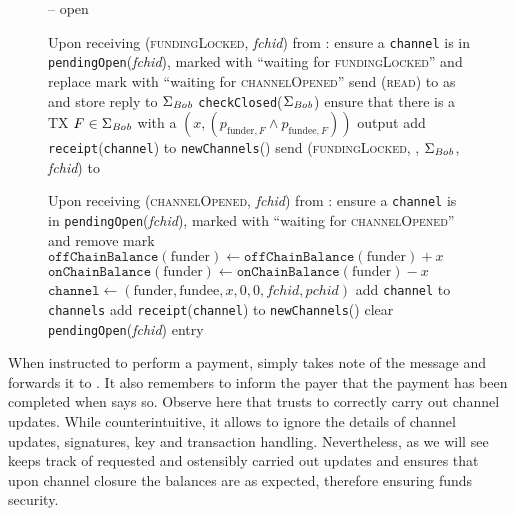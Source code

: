 \begin{figure}[H]
\begin{systembox}{\fpaynet{} -- open}
\begin{algorithmic}[1]
        \State Upon receiving (\textsc{fundingLocked}, \textit{fchid}) from
        \simulator:
        \Indent
          \State ensure a \texttt{channel} is in
          \texttt{pendingOpen}(\textit{fchid}), marked with ``waiting for
          \textsc{fundingLocked}'' and replace mark with ``waiting for
          \textsc{channelOpened}''
          \State send (\textsc{read}) to \ledger{} as \bob{} and store reply
          to $\Sigma_{\mathit{Bob}}$
          \State \texttt{checkClosed}($\Sigma_{\mathit{Bob}}$)
          \label{alg:fpaynet:checkForNew:read:bob}
          \State ensure that there is a TX $F \in \Sigma_{\mathit{Bob}}$ with a
          $\left(x, \left(p_{\mathrm{funder}, F} \wedge p_{\mathrm{fundee},
          F}\right)\right)$ output
          \State add \texttt{receipt}(\texttt{channel}) to
          \texttt{newChannels}(\bob)
          \label{alg:fpaynet:fundingLocked:report}
          \State send (\textsc{fundingLocked}, \bob, $\Sigma_{\mathit{Bob}}$,
          \textit{fchid}) to \simulator
          \label{alg:fpaynet:fundingLocked:sim}
        \EndIndent
        \Statex

        \State Upon receiving (\textsc{channelOpened}, \textit{fchid}) from
        \simulator:
        \Indent
          \State ensure a \texttt{channel} is in
          \texttt{pendingOpen}(\textit{fchid}), marked with ``waiting for
          \textsc{channelOpened}'' and remove mark
          \State $\mathtt{offChainBalance}\left(\mathrm{funder}\right) \gets
          \mathtt{offChainBalance}\left(\mathrm{funder}\right) + x$
          \label{alg:fpaynet:channelOpened:offchain}
          \State $\mathtt{onChainBalance}\left(\mathrm{funder}\right) \gets
          \mathtt{onChainBalance}\left(\mathrm{funder}\right) - x$
          \label{alg:fpaynet:channelOpened:onchain}
          \State $\mathtt{channel} \gets \left(\mathrm{funder}, \mathrm{fundee},
          x, 0, 0, \mathit{fchid}, \mathit{pchid}\right)$
          \State add \texttt{channel} to \texttt{channels}
          \State add \texttt{receipt}(\texttt{channel}) to
          \texttt{newChannels}(\alice)
          \label{alg:fpaynet:channelOpened:report}
          \State clear \texttt{pendingOpen}(\textit{fchid}) entry
        \EndIndent
      \end{algorithmic}
    \end{systembox}
    \caption{}
    \label{alg:fpaynet:open}
  \end{figure}

  When instructed to perform a payment, \fpaynet{} simply takes note of the
  message and forwards it to \simulator. It also remembers to inform the payer
  that the payment has been completed when \simulator{} says so. Observe here
  that \fpaynet{} trusts \simulator{} to correctly carry out channel updates.
  While counterintuitive, it allows \fpaynet{} to ignore the details of channel
  updates, signatures, key and transaction handling. Nevertheless, as we will
  see \fpaynet{} keeps track of requested and ostensibly carried out updates and
  ensures that upon channel closure the balances are as expected, therefore
  ensuring funds security.

